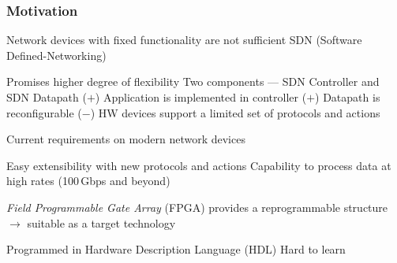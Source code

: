 \begin{frame}
    \frametitle{Motivation}
    \begin{itemize}
        \fitem Network devices with fixed functionality are not sufficient
        \fitem SDN (Software Defined-Networking)
        \begin{itemize}
            \fitem Promises higher degree of flexibility 
            \fitem Two components --- SDN Controller and SDN Datapath
            \fitem ($\bm{+}$) Application is implemented in controller
            \fitem ($\bm{+}$) Datapath is reconfigurable 
            \fitem ($\bm{-}$) HW devices support a limited set of protocols and actions
        \end{itemize}
        
        \fitem Current requirements on modern network devices
        \begin{itemize}
            \fitem Easy extensibility with new protocols and actions
            \fitem Capability to process data at high rates (100\,Gbps and beyond)
        \end{itemize}
        
        \fitem \textit{Field Programmable Gate Array} (FPGA) provides a reprogrammable structure $\rightarrow$ suitable as a target technology 
        \begin{itemize}
            \fitem Programmed in Hardware Description Language (HDL)
            \fitem Hard to learn
        \end{itemize}
    \end{itemize}
\end{frame}